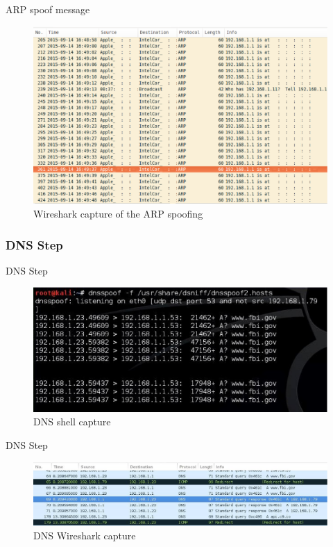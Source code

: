 \documentclass{beamer}
\begin{document}
\begin{frame}{ARP spoof message}

	\begin{figure}[!h]
		\centering
		\includegraphics[scale=0.4]{../images/wiresharArpSpoof.eps}
		\caption{Wireshark capture of the ARP spoofing}
		\label{Wireshark_ARP_Spoof}
	\end{figure}
\end{frame}

\subsubsection{DNS Step}
\begin{frame}{DNS Step}
	\begin{figure}[!h]
		\centering
		\includegraphics[scale=0.4]{../images/DNSCaptureShell.eps}
		\caption{DNS shell capture}
		\label{DNSCaptureShell}
	\end{figure}
\end{frame}
\begin{frame}{DNS Step}
	\begin{figure}[!h]
		\centering
		\includegraphics[scale=0.25]{../images/DNSCaptureWireshark.eps}
		\caption{DNS Wireshark capture}
		\label{DNSCaptureWireshark}
	\end{figure}
\end{frame}
\end{document}
